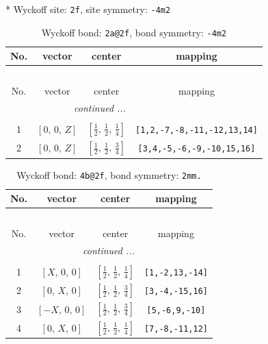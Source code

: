 \documentclass[fleqn,8pt]{jsarticle}
\begin{document}
* Wyckoff site: {\tt 2f}, site symmetry: {\tt -4m2}
\renewcommand{\arraystretch}{1.2}
\begin{longtable}{cccc}
\caption{Wyckoff bond: {\tt 2a@2f}, bond symmetry: {\tt -4m2}}
 \\
 \hline \hline
No. & vector & center & mapping \\ \hline \endfirsthead

\multicolumn{3}{l}{\tablename\ \thetable{}} \\
 \hline \hline
No. & vector & center & mapping \\ \hline \endhead

 \hline \hline
\multicolumn{3}{r}{\footnotesize\it continued ...} \\ \endfoot

 \hline \hline
\multicolumn{3}{r}{} \\ \endlastfoot

1 & $\left[ 0,\, 0,\, Z \right]$ & $\left[ \frac{1}{2},\, \frac{1}{2},\, \frac{1}{4} \right]$ & {\tt [1,2,-7,-8,-11,-12,13,14]} \\ \hline
2 & $\left[ 0,\, 0,\, Z \right]$ & $\left[ \frac{1}{2},\, \frac{1}{2},\, \frac{3}{4} \right]$ & {\tt [3,4,-5,-6,-9,-10,15,16]} \\
\end{longtable}
\renewcommand{\arraystretch}{1.2}
\begin{longtable}{cccc}
\caption{Wyckoff bond: {\tt 4b@2f}, bond symmetry: {\tt 2mm.}}
 \\
 \hline \hline
No. & vector & center & mapping \\ \hline \endfirsthead

\multicolumn{3}{l}{\tablename\ \thetable{}} \\
 \hline \hline
No. & vector & center & mapping \\ \hline \endhead

 \hline \hline
\multicolumn{3}{r}{\footnotesize\it continued ...} \\ \endfoot

 \hline \hline
\multicolumn{3}{r}{} \\ \endlastfoot

1 & $\left[ X,\, 0,\, 0 \right]$ & $\left[ \frac{1}{2},\, \frac{1}{2},\, \frac{1}{4} \right]$ & {\tt [1,-2,13,-14]} \\ \hline
2 & $\left[ 0,\, X,\, 0 \right]$ & $\left[ \frac{1}{2},\, \frac{1}{2},\, \frac{3}{4} \right]$ & {\tt [3,-4,-15,16]} \\ \hline
3 & $\left[ - X,\, 0,\, 0 \right]$ & $\left[ \frac{1}{2},\, \frac{1}{2},\, \frac{3}{4} \right]$ & {\tt [5,-6,9,-10]} \\ \hline
4 & $\left[ 0,\, X,\, 0 \right]$ & $\left[ \frac{1}{2},\, \frac{1}{2},\, \frac{1}{4} \right]$ & {\tt [7,-8,-11,12]} \\
\end{longtable}
\end{document}
